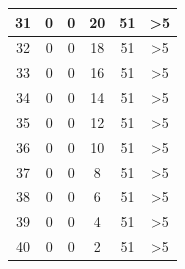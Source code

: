 \begin{longtable}{|c|c|c|c|c|c|}
		31                                           & 0                      & 0                     & 20                    & 51                     & >5                                                \\ \hline
		32                                           & 0                      & 0                     & 18                    & 51                     & >5                                        \\ \hline
		33                                           & 0                      & 0                     & 16                    & 51                     & >5                                             \\ \hline
		34                                           & 0                      & 0                     & 14                    & 51                     & >5                                        \\ \hline
		35                                           & 0                      & 0                     & 12                    & 51                     & >5                                                \\ \hline
		36                                           & 0                      & 0                     & 10                    & 51                     & >5                                                \\ \hline
		37                                           & 0                      & 0                     & 8                     & 51                     & >5                                              \\ \hline
		38                                           & 0                      & 0                     & 6                     & 51                     & >5                                                \\ \hline
		39                                           & 0                      & 0                     & 4                     & 51                     & >5                                               \\ \hline
		40                                           & 0                      & 0                     & 2                     & 51                     & >5                                              \\ \hline
	\end{longtable}
